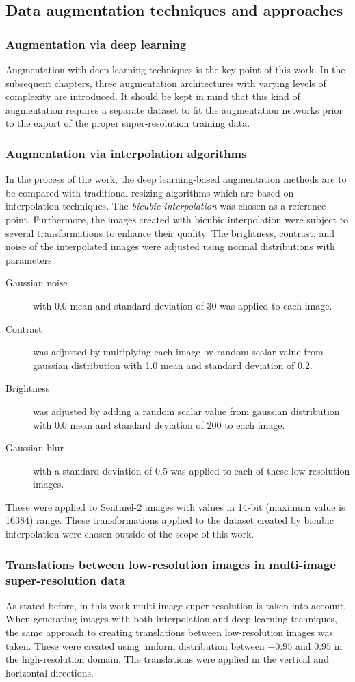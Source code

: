 \subsection{Data augmentation techniques and approaches}
\subsubsection{Augmentation via deep learning}
Augmentation with deep learning techniques is the key point of this work.
In the subsequent chapters, three augmentation architectures with varying levels of complexity are introduced.
It should be kept in mind that this kind of augmentation requires a separate dataset to fit the augmentation networks prior to the export of the proper super-resolution training data.

\subsubsection{Augmentation via interpolation algorithms}
In the process of the work, the deep learning-based augmentation methods are to be compared with traditional resizing algorithms which are based on interpolation techniques.
The \textit{bicubic interpolation} was chosen as a reference point.
Furthermore, the images created with bicubic interpolation were subject to several transformations to enhance their quality.
The brightness, contrast, and noise of the interpolated images were adjusted using normal distributions with parameters:
\begin{description}
	\item[Gaussian noise] with 0.0 mean and standard deviation of 30 was applied to each image.
	\item[Contrast] was adjusted by multiplying each image by random scalar value from gaussian distribution with 1.0 mean and standard deviation of 0.2.
	\item[Brightness] was adjusted by adding a random scalar value from gaussian distribution with 0.0 mean and standard deviation of 200 to each image.
	\item[Gaussian blur] with a standard deviation of 0.5 was applied to each of these low-resolution images.
\end{description}
These were applied to Sentinel-2 images with values in 14-bit (maximum value is 16384) range.
These transformations applied to the dataset created by bicubic interpolation were chosen outside of the scope of this work.

\subsubsection{Translations between low-resolution images in multi-image super-resolution data}
As stated before, in this work multi-image super-resolution is taken into account.
When generating images with both interpolation and deep learning techniques, the same approach to creating translations between low-resolution images was taken.
These were created using uniform distribution between $-0.95$ and $0.95$ in the high-resolution domain.
The translations were applied in the vertical and horizontal directions.

